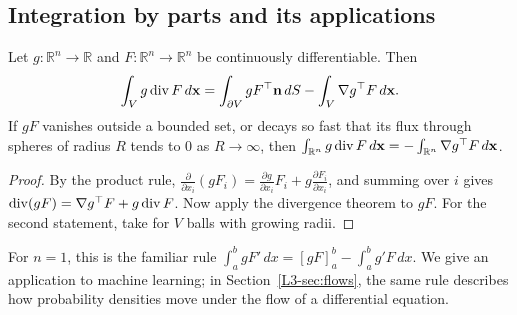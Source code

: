 \subsection{Integration by parts and its applications}

\begin{corollary}\label{L3-cor:integration-by-parts}
    Let $g: \mathbb{R}^n \to \mathbb{R}$ and $F: \mathbb{R}^n \to \mathbb{R}^n$ be continuously differentiable. Then
    \[\int_V g\operatorname{div} F\, d\mathbf{x} = \int_{\partial V} gF^\top\mathbf{n}\, dS - \int_V \nabla g^\top F\, d\mathbf{x}.\]
    If $gF$ vanishes outside a bounded set, or decays so fast that its flux through spheres of radius $R$ tends to $0$ as $R \to \infty$, then $\int_{\mathbb{R}^n} g\operatorname{div} F\, d\mathbf{x} = -\int_{\mathbb{R}^n} \nabla g^\top F\, d\mathbf{x}$.
\end{corollary}

\begin{proof}
    By the product rule, $\frac{\partial}{\partial x_i}(gF_i) = \frac{\partial g}{\partial x_i}F_i + g\frac{\partial F_i}{\partial x_i}$, and summing over $i$ gives $\operatorname{div}(gF) = \nabla g^\top F + g\operatorname{div} F$. Now apply the divergence theorem to $gF$. For the second statement, take for $V$ balls with growing radii.
\end{proof}

For $n = 1$, this is the familiar rule $\int_a^b gF'\, dx = [gF]_a^b - \int_a^b g'F\, dx$. We give an application to machine learning; in Section~\ref{L3-sec:flows}, the same rule describes how probability densities move under the flow of a differential equation.

